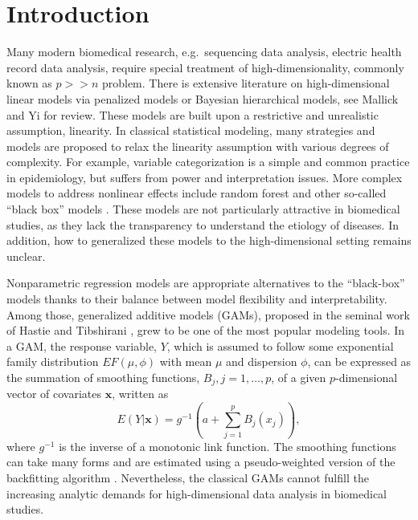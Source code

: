 \documentclass[AMA,STIX1COL,]{WileyNJD-v2}
\begin{document}
\pgfplotsset{compat=1.18}
\usetikzlibrary{shapes.geometric, arrows, positioning, calc, matrix, backgrounds, fit}
\newcommand{\bs}[1]{\boldsymbol{#1}}
\newcommand{\tp}{\text{pen}}
\newcommand{\pr}{\text{Pr}}

\hypertarget{introduction}{%
\section{Introduction}\label{introduction}}

\label{sec:intro}

Many modern biomedical research, e.g.~sequencing data analysis, electric
health record data analysis, require special treatment of
high-dimensionality, commonly known as \(p >> n\) problem. There is
extensive literature on high-dimensional linear models via penalized
models or Bayesian hierarchical models, see Mallick and Yi
\citep{Mallick2013} for review. These models are built upon a
restrictive and unrealistic assumption, linearity. In classical
statistical modeling, many strategies and models are proposed to relax
the linearity assumption with various degrees of complexity. For
example, variable categorization is a simple and common practice in
epidemiology, but suffers from power and interpretation issues. More
complex models to address nonlinear effects include random forest and
other so-called ``black box'' models \citep{Breiman2001}. These models
are not particularly attractive in biomedical studies, as they lack the
transparency to understand the etiology of diseases. In addition, how to
generalized these models to the high-dimensional setting remains
unclear.

Nonparametric regression models are appropriate alternatives to the
``black-box'' models thanks to their balance between model flexibility
and interpretability. Among those, generalized additive models (GAMs),
proposed in the seminal work of Hastie and Tibshirani
\citep{Hastie1987}, grew to be one of the most popular modeling tools.
In a GAM, the response variable, \(Y\), which is assumed to follow some
exponential family distribution \(EF(\mu, \phi)\) with mean \(\mu\) and
dispersion \(\phi\), can be expressed as the summation of smoothing
functions, \(B_j, j = 1, \dots, p\), of a given \(p\)-dimensional vector
of covariates \(\boldsymbol{x}\), written as \[
 E(Y|\boldsymbol{x}) = g^{-1}(a + \sum\limits^p_{j=1}B_j(x_j)),
\] where \(g^{-1}\) is the inverse of a monotonic link function. The
smoothing functions can take many forms and are estimated using a
pseudo-weighted version of the backfitting algorithm
\citep{Breiman1985}. Nevertheless, the classical GAMs cannot fulfill the
increasing analytic demands for high-dimensional data analysis in
biomedical studies.
\end{document}
